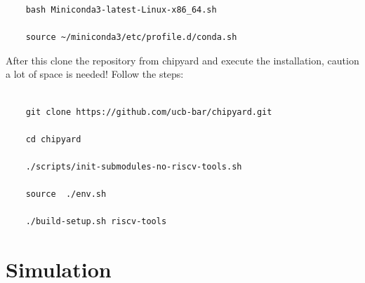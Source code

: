 \documentclass{article}
\begin{document}
{\begin{verbatim}
    bash Miniconda3-latest-Linux-x86_64.sh

    source ~/miniconda3/etc/profile.d/conda.sh
\end{verbatim}
After this clone the repository from chipyard and execute the installation, caution a lot of space is needed! Follow the steps:\\\\
\begin{verbatim}
    git clone https://github.com/ucb-bar/chipyard.git
	
	cd chipyard
	
	./scripts/init-submodules-no-riscv-tools.sh 
	
	source  ./env.sh
	
	./build-setup.sh riscv-tools
\end{verbatim}


\section*{Simulation}
}
\end{document}
